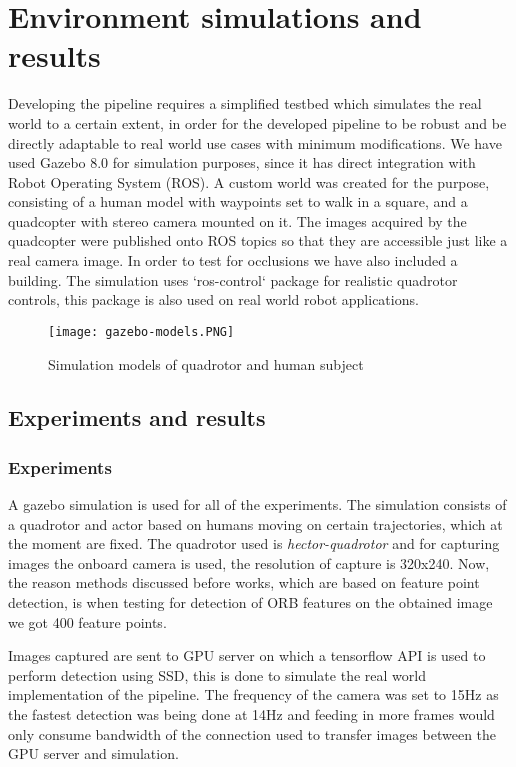 \chapter{Environment simulations and results}

Developing the pipeline requires a simplified testbed which simulates the real world to a certain extent, in order for the developed pipeline to be robust and be directly
adaptable to real world use cases with minimum modifications. We have used Gazebo 8.0 for simulation purposes, since it has direct integration with Robot Operating System
(ROS). A custom world was created for the purpose, consisting of a human model with waypoints set to walk in a square, and a quadcopter with stereo camera mounted on it.
The images acquired by the quadcopter were published onto ROS topics so that they are accessible just like a real camera image. In order to test for occlusions we have also included a building. The simulation uses ‘ros-control‘ package for realistic quadrotor controls, this package is also used on real world robot applications.

\begin{figure}[htb]
	\centering
	\texttt{[image: gazebo-models.PNG]}
	\caption{Simulation models of quadrotor and human subject\label{Simulation}}
\end{figure}

\section{Experiments and results}
\label{sec:Experiments and results}

\subsection{Experiments}
\label{sec:Experiments}

A gazebo simulation is used for all of the experiments. The simulation consists of a quadrotor and actor based on humans moving on certain trajectories, which at the moment are fixed. The quadrotor used is \emph{hector-quadrotor} and for capturing images the onboard camera is used, the resolution of capture is 320x240. Now, the reason methods discussed before works, which are based on feature point detection, is when testing for detection of ORB features on the obtained image we got 400 feature points.

Images captured are sent to GPU server on which a tensorflow API is used to perform detection using SSD, this is done to simulate the real world implementation of the
pipeline. The frequency of the camera was set to 15Hz as the fastest detection was being done at 14Hz and feeding in more frames would only consume bandwidth of the
connection used to transfer images between the GPU server and simulation.

